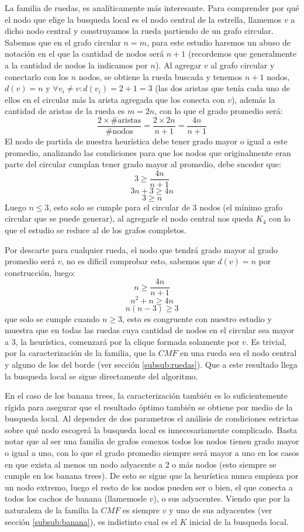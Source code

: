 La familia de ruedas, es anal\'iticamente m\'as interesante. 
Para comprender por qu\'e el nodo que elige la busqueda local
es el nodo central de la estrella, llamemos $v$ a dicho nodo 
central y construyamos la rueda partiendo de un grafo circular.
Sabemos que en el grafo circular $n = m$, para este estudio
haremos un abuso de notaci\'on en el que la cantidad de nodos
ser\'a $n+1$ (recordemos que generalmente a la cantidad de nodos
la indicamos por $n$). Al agregar $v$ al grafo circular y 
conectarlo con los $n$ nodos, se obtiene la rueda buscada
y tenemos $n+1$ nodos, $d(v)=n$ y 
$\forall v_i \neq v: d(v_i) = 2 + 1 = 3$ (las dos aristas que 
ten\'ia cada uno de ellos en el circular m\'as la arista agregada 
que los conecta con $v$), adem\'as la cantidad de
aristas de la rueda es $m=2n$, con lo que el grado promedio
ser\'a: 
\[\frac{2 \times \text{\#aristas}}{\text{\#nodos}} = 
\frac{2 \times 2n}{n+1} =
\frac{4n}{n+1}\]
El nodo de partida de nuestra heur\'istica debe tener grado
mayor o igual a este promedio, analizando las condiciones
para que los nodos que originalmente eran parte del circular
cumplan tener grado mayor al promedio, debe suceder que:
\[ 3 \geq \frac{4n}{n+1} \]
\[ 3n +3 \geq 4n \]
\[ 3 \geq n \]
Luego $n \leq 3$, esto solo se cumple para el circular de 
3 nodos (el m\'inimo grafo circular que se puede generar),
al agregarle el nodo central nos queda $K_4$ con lo 
que el estudio se reduce al de los grafos completos.

Por descarte para cualquier rueda, el nodo que tendr\'a
grado mayor al grado promedio ser\'a $v$, no es dificil
comprobar esto, sabemos que $d(v)= n$ por construcci\'on, 
luego:
\[ n \geq \frac{4n}{n+1} \]
\[ n^2 + n \geq 4n \]
\[ n(n-3) \geq 3 \]
que solo se cumple cuando $n \geq 3$, esto es congruente
con nuestro estudio y muestra que en todas las ruedas
cuya cantidad de nodos en el circular sea mayor a 3, 
la heur\'istica, comenzar\'a por la clique formada solamente
por $v$. 
Es trivial, por la caracterizaci\'on de la familia, que 
la $CMF$ en una rueda sea el nodo central y alguno de los
del borde (ver secci\'on \ref{subsub:ruedas}). Que a este resultado 
llega la busqueda local se sigue directamente del algoritmo.

En el caso de los banana trees, la caracterizaci\'on tambi\'en
es lo suficientemente r\'igida para asegurar que el resultado
\'optimo tambi\'en se obtiene por medio de la busqueda local.
Al depender de dos parametros el an\'alisis de condiciones
estrictas sobre qu\'e nodo escoger\'a la busqueda local
es innecesariamente complicado. Basta notar que al ser una
familia de grafos conexos todos los nodos tienen grado
mayor o igual a uno, con lo que el grado promedio siempre
ser\'a mayor a uno en los casos en que exista al menos un nodo
adyacente a 2 o m\'as nodos (esto siempre se cumple en los
banana trees). De esto se sigue que la heur\'istica nunca
empieza por un nodo extremo, luego el resto de los nodos
pueden ser o bien, el que conecta a todos los cachos de banana 
(llamemosle $v$), o sus adyacentes. Viendo que por la 
naturaleza de la familia la $CMF$ es siempre $v$ y uno de 
sus adyacentes (ver secci\'on \ref{subsub:banana}), es indistinto cual
es el $K$ inicial de la busqueda local.

